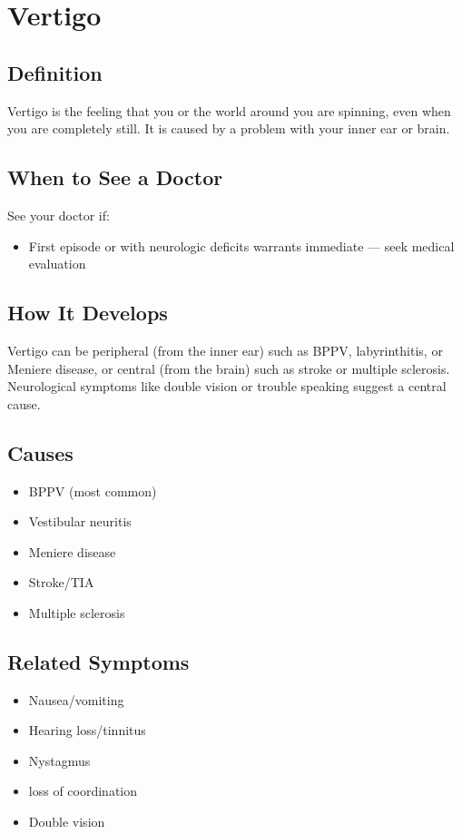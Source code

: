 \chapter{Vertigo}

\section*{Definition}
Vertigo is the feeling that you or the world around you are spinning, even when you are completely still. It is caused by a problem with your inner ear or brain.

\section*{When to See a Doctor}
See your doctor if:
\begin{itemize}
  \item First episode or with neurologic deficits warrants immediate — seek medical evaluation
\end{itemize}

\section*{How It Develops}
Vertigo can be peripheral (from the inner ear) such as BPPV, labyrinthitis, or Meniere disease, or central (from the brain) such as stroke or multiple sclerosis. Neurological symptoms like double vision or trouble speaking suggest a central cause.

\section*{Causes}
\begin{itemize}
  \item BPPV (most common)
  \item Vestibular neuritis
  \item Meniere disease
  \item Stroke/TIA
  \item Multiple sclerosis
\end{itemize}

\section*{Related Symptoms}
\begin{itemize}
  \item Nausea/vomiting
  \item Hearing loss/tinnitus
  \item Nystagmus
  \item loss of coordination
  \item Double vision
\end{itemize}

